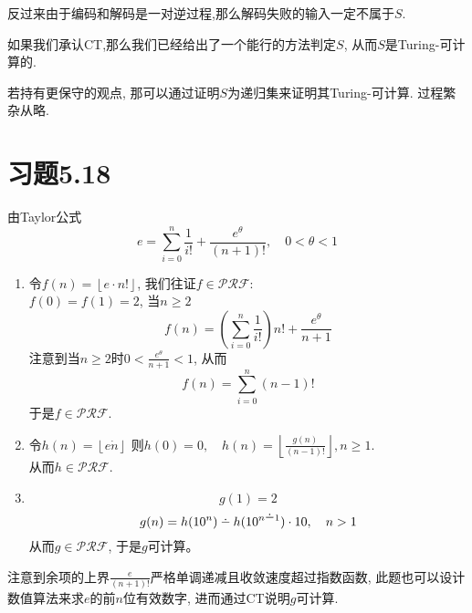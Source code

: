 \documentclass{article}
\newcommand{\floor}[1]{\left\lfloor #1 \right\rfloor}
\def\dotminus{\mathbin{\ooalign{\hss\raise1ex\hbox{.}\hss\cr
  \mathsurround=0pt$-$}}}
\begin{document}
反过来由于编码和解码是一对逆过程,那么解码失败的输入一定不属于$S$. 

如果我们承认CT,那么我们已经给出了一个能行的方法判定$S$, 从而$S$是Turing-可计算的. 

若持有更保守的观点, 那可以通过证明$S$为递归集来证明其Turing-可计算. 过程繁杂从略. 

\section*{习题5.18}


由Taylor公式
$$e=\sum_{i=0}^n\frac{1}{i!}+\frac{e^\theta}{(n+1)!}, \quad 0<\theta<1$$
\begin{enumerate}[(1)]
\item 
令$f(n) = \floor{e\cdot n!}$, 我们往证$f \in \mathcal{PRF}$:\\
$f(0)=f(1)=2$, 当$n\ge 2$
$$f(n)=\left(\sum_{i=0}^n\frac{1}{i!}\right)n!+\frac{e^\theta}{n+1}$$
注意到当$n\ge 2$时$0< \frac{e^\theta}{n+1} < 1$, 从而
$$f(n) = \sum_{i=0}^n (n-1)!$$
于是$f \in \mathcal{PRF}$. 
\item
令$h(n)=\floor{e\dot n}$
则$h(0)=0,\quad h(n) = \floor{\frac{g(n)}{(n-1)!}}, n \ge 1$.  \\
从而$h \in \mathcal{PRF}$. 
\item
$$g(1) = 2$$
$$g(n) = h(10^n) \dotminus h(10^{n\dotminus 1}) \cdot 10, \quad n > 1$$
从而$g \in \mathcal{PRF}$, 于是$g$可计算。

\end{enumerate}
注意到余项的上界$\frac{e}{(n+1)!}$严格单调递减且收敛速度超过指数函数, 此题也可以设计数值算法来求$e$的前$n$位有效数字, 进而通过CT说明$g$可计算. 
\end{document}
